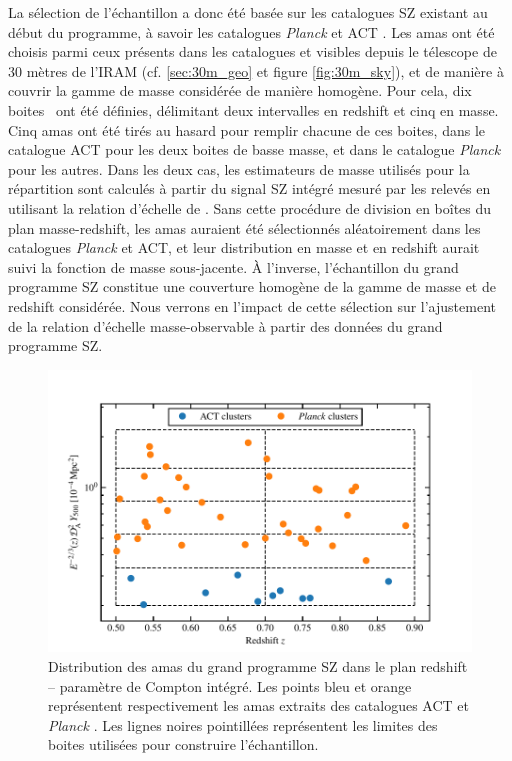 La sélection de l'échantillon a donc été basée sur les catalogues SZ existant au début du programme, à savoir les catalogues \textit{Planck} et ACT \cite{planck_collaboration_planck_2016-3, hasselfield_atacama_2013}.
Les amas ont été choisis parmi ceux présents dans les catalogues et visibles depuis le télescope de 30 mètres de l'IRAM (cf. \ref{sec:30m_geo} et figure \ref{fig:30m_sky}), et de manière à couvrir la gamme de masse considérée de manière homogène.
Pour cela, dix \guillemotleft boites \guillemotright\ ont été définies, délimitant deux intervalles en redshift et cinq en masse.
Cinq amas ont été tirés au hasard pour remplir chacune de ces boites, dans le catalogue ACT pour les deux boites de basse masse, et dans le catalogue \textit{Planck} pour les autres.
Dans les deux cas, les estimateurs de masse utilisés pour la répartition sont calculés à partir du signal SZ intégré mesuré par les relevés en utilisant la relation d'échelle de \cite{arnaud_universal_2010}.
Sans cette procédure de division en boîtes du plan masse-redshift, les amas auraient été sélectionnés aléatoirement dans les catalogues \textit{Planck} et ACT, et leur distribution en masse et en redshift aurait suivi la fonction de masse sous-jacente.
À l'inverse, l'échantillon du grand programme SZ constitue une couverture homogène de la gamme de masse et de redshift considérée.
Nous verrons en  l'impact de cette sélection sur l'ajustement de la relation d'échelle masse-observable à partir des données du grand programme SZ.

\begin{figure}[t]
    \centering
    \includegraphics[width=.8\linewidth]{Figures/Chap_nk/lpsz_sample.pdf}
    \caption{
        Distribution des amas du grand programme SZ dans le plan redshift -- paramètre de Compton intégré.
        Les points bleu et orange représentent respectivement les amas extraits des catalogues ACT \cite{hasselfield_atacama_2013} et \textit{Planck} \cite{planck_collaboration_planck_2016-3}.
        Les lignes noires pointillées représentent les limites des boites utilisées pour construire l'échantillon.
    }
    \label{fig:lpsz_sample}
\end{figure}

